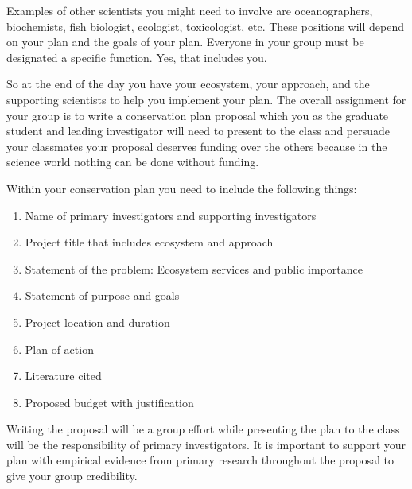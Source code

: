 Examples of other scientists you might need to involve are
oceanographers, biochemists, fish biologist, ecologist, toxicologist,
etc. These positions will depend on your plan and the goals of your
plan. Everyone in your group must be designated a specific function.
Yes, that includes you.

So at the end of the day you have your ecosystem, your approach, and the
supporting scientists to help you implement your plan. The overall
assignment for your group is to write a conservation plan proposal which
you as the graduate student and leading investigator will need to
present to the class and persuade your classmates your proposal deserves
funding over the others because in the science world nothing can be done
without funding.

Within your conservation plan you need to include the following things:

\begin{enumerate}
\def\labelenumi{\arabic{enumi}.}
\item
  Name of primary investigators and supporting investigators
\item
  Project title that includes ecosystem and approach
\item
  Statement of the problem: Ecosystem services and public importance
\item
  Statement of purpose and goals
\item
  Project location and duration
\item
  Plan of action
\item
  Literature cited
\item
  Proposed budget with justification
\end{enumerate}

Writing the proposal will be a group effort while presenting the plan to
the class will be the responsibility of primary investigators. It is
important to support your plan with empirical evidence from primary
research throughout the proposal to give your group credibility.
